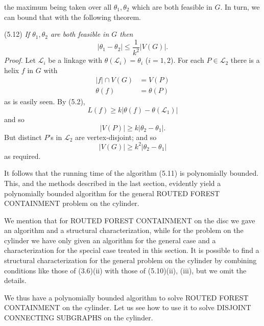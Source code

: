 \noindent the maximum being taken over all $\theta_1, \theta_2$ which are both feasible in $G$. In turn, we can bound that with the following theorem.

\stmt
(5.12) \textit{If $\theta_1, \theta_2$ are both feasible in $G$ then}
\begin{equation*}
|\theta_1 - \theta_2| \le \frac{1}{k^2} |V(G)|.
\end{equation*}
\textit{Proof.} Let $\mathcal{L}_i$ be a linkage with $\theta(\mathcal{L}_i) = \theta_i$ ($i = 1, 2$). For each $P \in \mathcal{L}_2$ there is a helix $f$ in $G$ with
\begin{align*}
|f| \cap V(G) &= V(P) \\
\theta(f) &= \theta(P)
\end{align*}
as is easily seen. By (5.2),
\begin{equation*}
L(f) \ge k |\theta(f) - \theta(\mathcal{L}_1)|
\end{equation*}
and so
\begin{equation*}
|V(P)| \ge k |\theta_2 - \theta_1|.
\end{equation*}
But distinct $P$'s in $\mathcal{L}_2$ are vertex-disjoint; and so
\begin{equation*}
|V(G)| \ge k^2 |\theta_2 - \theta_1|
\end{equation*}
as required.

It follows that the running time of the algorithm (5.11) is polynomially bounded. This, and the methods described in the last section, evidently yield a polynomially bounded algorithm for the general ROUTED FOREST CONTAINMENT problem on the cylinder.

We mention that for ROUTED FOREST CONTAINMENT on the disc we gave an algorithm and a structural characterization, while for the problem on the cylinder we have only given an algorithm for the general case and a characterization for the special case treated in this section. It is possible to find a structural characterization for the general problem on the cylinder by combining conditions like those of (3.6)(ii) with those of (5.10)(ii), (iii), but we omit the details.


We thus have a polynomially bounded algorithm to solve ROUTED FOREST CONTAINMENT on the cylinder. Let us see how to use it to solve DISJOINT CONNECTING SUBGRAPHS on the cylinder.
